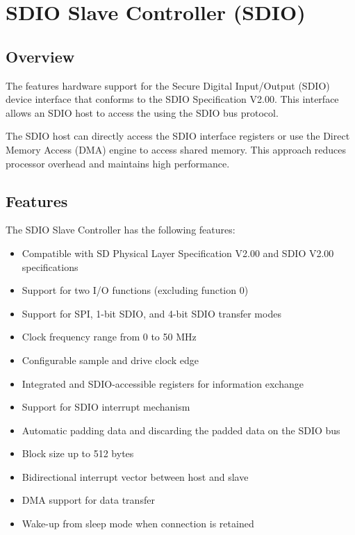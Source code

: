 \documentclass[main\_\_EN.tex]{subfiles}
\begin{document}

\ifglobal
\else
    \listoftodos
    {\let\clearpage\relax \listofdonetodos}
    \tableofcontents
\fi



\hypertarget{alias}{}
\chapter{SDIO Slave Controller (SDIO)}
\label{mod:sdioslave}


\section{Overview}


The \chipname{} features hardware support for the Secure Digital Input/Output (SDIO) device interface that conforms to the SDIO Specification V2.00. This interface allows an SDIO host to access the \chipname{} using the SDIO bus protocol.

The SDIO host can directly access the \chipname{} SDIO interface registers or use the Direct Memory Access (DMA) engine to access shared memory. This approach reduces processor overhead and maintains high performance.


\section{Features}

The SDIO Slave Controller has the following features:
\begin{itemize}
    \item Compatible with SD Physical Layer Specification V2.00 and SDIO V2.00 specifications
    \item Support for two I/O functions (excluding function 0)
    \item Support for SPI, 1-bit SDIO, and 4-bit SDIO transfer modes
    \item Clock frequency range from 0 to 50 MHz
    \item Configurable sample and drive clock edge
    \item Integrated and SDIO-accessible registers for information exchange
    \item Support for SDIO interrupt mechanism
    \item Automatic padding data and discarding the padded data on the SDIO bus
    \item Block size up to 512 bytes
    \item Bidirectional interrupt vector between host and slave
    \item DMA support for data transfer
    \item Wake-up from sleep mode when connection is retained
\end{itemize}
\end{document}
